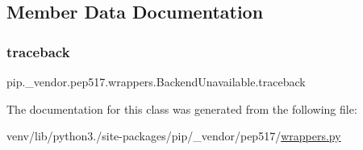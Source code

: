 \subsection{Member Data Documentation}
\mbox{\label{classpip_1_1__vendor_1_1pep517_1_1wrappers_1_1BackendUnavailable_abdd39ad076fb2dd049cfb9f4d6182e14}} 
\subsubsection{\texorpdfstring{traceback}{traceback}}
{\footnotesize\ttfamily pip.\+\_\+vendor.\+pep517.\+wrappers.\+Backend\+Unavailable.\+traceback}



The documentation for this class was generated from the following file\+:\begin{DoxyCompactItemize}
\item 
venv/lib/python3./site-\/packages/pip/\+\_\+vendor/pep517/\hyperlink{wrappers_8py}{wrappers.\+py}\end{DoxyCompactItemize}
